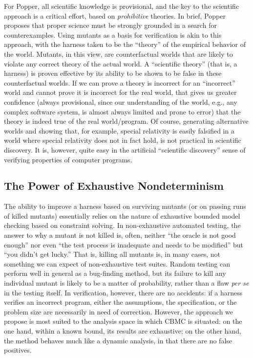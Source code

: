 \documentclass[conference]{IEEEtran}
\begin{document}
For Popper, all scientific knowledge is provisional, and the key to
the scientific approach is a critical effort, based on
\emph{prohibitive} theories.  In brief, Popper proposes that proper
science must be strongly grounded in a search for counterexamples.
Using mutants as a basis for verification is akin to this approach,
with the harness taken to be the ``theory'' of the empirical behavior
of the world.  Mutants, in this view, are counterfactual worlds that
are likely to violate any correct theory of the actual world.  A
``scientific theory'' (that is, a harness) is proven effective by its
ability to be shown to be false in these counterfactual worlds.
If we can prove a theory is incorrect for an ``incorrect'' world and
cannot prove it is incorrect for the real world, that gives us greater
confidence (always provisional, since our understanding of the world,
e.g., any complex software system, is almost always limited and prone
to error) that the theory is indeed true of the real world/program.
Of course, generating alternative worlds and showing that, for
example, special relativity is easily falsified in a world where
special relativity does not in fact hold, is not practical in
scientific discovery.  It is, however, quite easy in the artificial
``scientific discovery'' sense of verifying properties of computer programs.

\subsection{The Power of Exhaustive Nondeterminism}

The ability to improve a harness based on surviving mutants (or on
passing runs of killed mutants) essentially relies on the nature of
exhaustive bounded model checking based on constraint solving.  In
non-exhaustive automated testing, the answer to why a mutant is not
killed is, often, neither ``the oracle is not good enough'' nor even
``the test process is inadequate and needs to be modified'' but ``you
didn't get lucky.''  That is, killing all mutants is, in many cases,
not something we can expect of non-exhaustive test suites.  Random
testing \cite{HamletOnly,ICSEDiff} can perform well in general as a
bug-finding method, but its failure to kill any individual mutant is
likely to be a matter of probability, rather than a flaw \emph{per se}
in the testing itself.  In verification, however, there are no
accidents: if a harness verifies an incorrect program, either the
assumptions, the specification, or the problem size are necessarily in
need of correction.  However, the approach we propose is most suited
to the analysis space in which CBMC is situated: on the one hand,
within a known bound, its results are exhaustive; on the other hand,
the method behaves much like a dynamic analysis, in that there are no
false positives.
\end{document}
